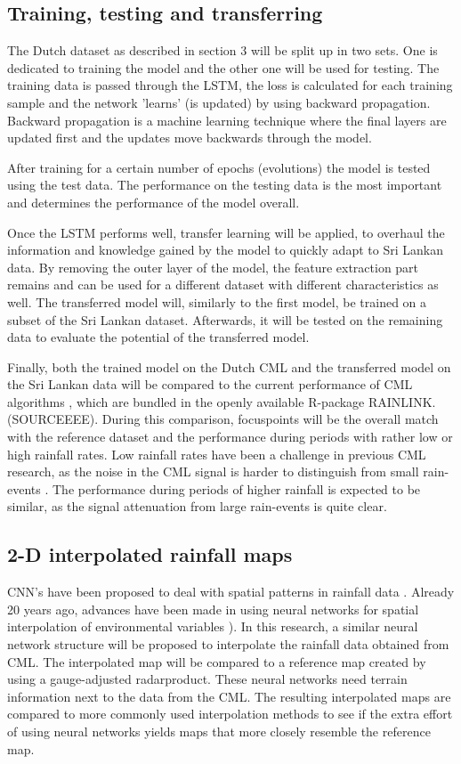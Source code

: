 \documentclass[twocolumn, 10pt, a4paper]{article}
\begin{document}
	\subsection{Training, testing and transferring}
	The  Dutch dataset as described in section 3 will be split up in two sets. One is dedicated to training the model and the other one will be used for testing. The training data is passed through the LSTM, the loss is calculated for each training sample and the network 'learns' (is updated) by using backward propagation. Backward propagation is a machine learning technique where the final layers are updated first and the updates move backwards through the model. 
	
	After training for a certain number of epochs (evolutions) the model is tested using the test data. The performance on the testing data is the most important and determines the performance of the model overall. 
	
	Once the LSTM performs well, transfer learning will be applied, to overhaul the information and knowledge gained by the model to quickly adapt to Sri Lankan data. By removing the outer layer of the model, the feature extraction part remains and can be used for a different dataset with different characteristics as well. The transferred model will, similarly to the first model, be trained on a subset of the Sri Lankan dataset. Afterwards, it will be tested on the remaining data to evaluate the potential of the transferred model. 
	
	Finally, both the trained model on the Dutch CML and the transferred model on the Sri Lankan data will be compared to the current performance of CML algorithms \cite{Overeem2011, Overeem2021}, which are bundled in the openly available R-package RAINLINK. (SOURCEEEE). During this comparison, focuspoints will be the overall match with the reference dataset and the performance during periods with rather low or high rainfall rates. Low rainfall rates have been a challenge in previous CML research, as the noise in the CML signal is harder to distinguish from small rain-events \cite{Uijlenhoet2018}. The performance during periods of higher rainfall is expected to be similar, as the signal attenuation from large rain-events is quite clear. 
	
	\subsection{2-D interpolated rainfall maps}
	CNN's have been proposed to deal with spatial patterns in rainfall data \cite{Sadeghi2019}. Already 20 years ago, advances have been made in using neural networks for spatial interpolation of environmental variables \cite{Rigol2001}). In this research, a similar neural network structure will be proposed to interpolate the rainfall data obtained from CML. The interpolated map will be compared to a reference map created by using a gauge-adjusted radarproduct.
	These neural networks need terrain information next to the data from the CML. The resulting interpolated maps are compared to more commonly used interpolation methods to see if the extra effort of using neural networks yields maps that more closely resemble the reference map.
	
\end{document}
